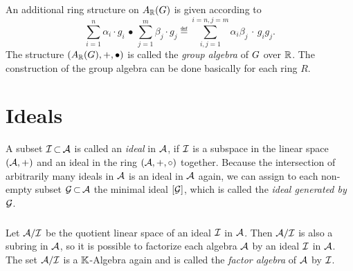 \documentclass[11pt,twoside]{article}
\begin{document}
\subparagraph{}
An additional ring structure on $A_{{\mathbb{R}}}(G)$ is given according to
\[
\sum_{i=1}^n \alpha_i \cdot g_i \, \bullet \,
\sum_{j=1}^m \beta_j  \cdot g_j
\eqdef
\sum_{i,j=1}^{i=n,j=m} \alpha_i \beta_j \, \cdot \, g_i g_j.
\]
The structure $(A_{{\mathbb{R}}}(G), + , \bullet)$ is called
the \textit{group algebra} of $G$ over ${\mathbb{R}}$.
The construction of the group algebra can be done basically for each ring $R$.

\section{Ideals}
A subset ${\mathcal{I}} {\,\subset\,} {\mathcal{A}}$ is called an \textit{ideal} in ${\mathcal{A}}$,
if ${\mathcal{I}}$ is a subspace in the linear space $({\mathcal{A}},+)$
and an ideal in the ring $({\mathcal{A}},+,\circ)$ together.
Because the intersection of arbitrarily many ideals in ${\mathcal{A}}$
is an ideal in ${\mathcal{A}}$ again,
we can assign to each non-empty subset ${\mathcal{G}} {\,\subset\,} {\mathcal{A}}$
the minimal ideal $[{\mathcal{G}}]$, which is called the
\textit{ideal generated by ${\mathcal{G}}$}.

\subparagraph{}
Let ${\mathcal{A}} / {\mathcal{I}}$ be the quotient linear space of an ideal ${\mathcal{I}}$ in ${\mathcal{A}}$.
Then ${\mathcal{A}}/{\mathcal{I}}$ is also a subring in ${\mathcal{A}}$,
so it is possible to factorize each algebra ${\mathcal{A}}$
by an ideal ${\mathcal{I}}$ in ${\mathcal{A}}$.
The set ${\mathcal{A}}/{\mathcal{I}}$ is a ${\mathbb{K}}$-Algebra again
and is called the \textit{factor algebra} of ${\mathcal{A}}$ by ${\mathcal{I}}$.

\end{document}

